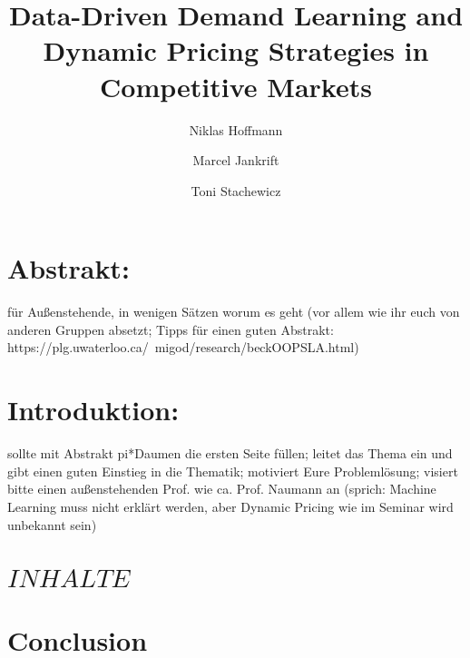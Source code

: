 \documentclass[sigconf]{acmart}
\begin{document}
\title{Data-Driven Demand Learning and Dynamic Pricing Strategies in Competitive Markets} 

\author{Niklas Hoffmann}
\author{Marcel Jankrift} 
\author{Toni Stachewicz}


\maketitle


\section{Abstrakt:} für Außenstehende, in wenigen Sätzen worum es geht (vor allem wie ihr euch von anderen Gruppen absetzt; Tipps für einen guten Abstrakt: https://plg.uwaterloo.ca/~migod/research/beckOOPSLA.html)
\section{Introduktion:} sollte mit Abstrakt pi*Daumen die ersten Seite füllen; leitet das Thema ein und gibt einen guten Einstieg in die Thematik; motiviert Eure Problemlösung; visiert bitte einen außenstehenden Prof. wie ca. Prof. Naumann an (sprich: Machine Learning muss nicht erklärt werden, aber Dynamic Pricing wie im Seminar wird unbekannt sein)
\section{$INHALTE$}
\section{Conclusion}





\end{document}
